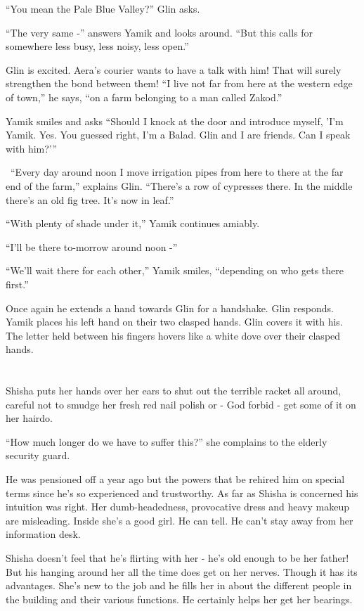 \documentclass[twoside,11pt]{book}
\begin{document}
``You mean the Pale Blue Valley?'' Glin asks.

``The very same -'' answers Yamik and looks around. ``But this calls for
somewhere less busy, less noisy, less open.''

Glin is excited. Aera's courier wants to have a talk with him! That will surely strengthen the bond between them!
``I live not far from here at the western edge of town,'' he says, ``on a farm
belonging to a man called Zakod.''

Yamik smiles and asks ``Should I knock at the door and introduce myself, 'I'm Yamik. Yes. You guessed
right, I'm a Balad. Glin and I are friends. Can I speak with him?'\thinspace''

\ ``Every day around noon I move irrigation pipes from here to there at the far end of the farm,'' explains
Glin. ``There's a row of cypresses there.  In the middle there's an old fig tree. It's now in leaf.''

``With plenty of shade under it,'' Yamik continues amiably.

``I'll be there to-morrow around noon -''

``We'll wait there for each other,'' Yamik smiles, ``depending on who gets there
first.''

Once again he extends a hand towards Glin for a handshake. Glin responds. Yamik places his left hand on their two
clasped hands. Glin covers it with his. The letter held between his fingers hovers like a white dove over their clasped
hands.


\bigskip

\chapter{}

Shisha puts her hands over her ears to shut out the terrible racket all around, careful not to smudge her fresh red
nail polish or - God forbid - get some of it on her hairdo.

``How much longer do we have to suffer this?'' she complains to the elderly security guard.

He was pensioned off a year ago but the powers that be rehired him on special terms since he's so experienced and
trustworthy. As far as Shisha is concerned his intuition was right. Her dumb-headedness, provocative dress and heavy
makeup are misleading. Inside she's a good girl. He can tell. He can't stay away from her information desk.

Shisha doesn't feel that he's flirting with her - he's old enough to be her father! But his hanging around her all the
time does get on her nerves. Though it has its advantages. She's new to the job and he fills her in
about the different people in the building and their various functions. He certainly helps her get her bearings.
\end{document}

